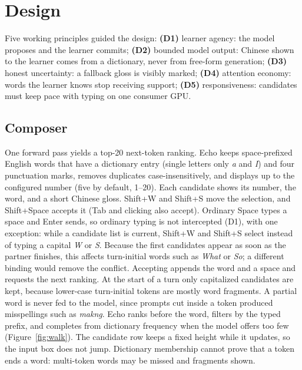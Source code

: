 \documentclass[11pt,a4paper]{article}
\begin{document}
\section{Design}
\label{sec:design}
Five working principles guided the design:
\textbf{(D1)} learner agency: the model proposes and the learner commits;
\textbf{(D2)} bounded model output: Chinese shown to the learner comes from a dictionary, never from free-form generation;
\textbf{(D3)} honest uncertainty: a fallback gloss is visibly marked;
\textbf{(D4)} attention economy: words the learner knows stop receiving support;
\textbf{(D5)} responsiveness: candidates must keep pace with typing on one consumer GPU.

\subsection{Composer}
One forward pass yields a top-20 next-token ranking. Echo keeps space-prefixed English words that have a dictionary entry (single letters only \emph{a} and \emph{I}) and four punctuation marks, removes duplicates case-insensitively, and displays up to the configured number (five by default, 1--20). Each candidate shows its number, the word, and a short Chinese gloss. Shift+W and Shift+S move the selection, and Shift+Space accepts it (Tab and clicking also accept). Ordinary Space types a space and Enter sends, so ordinary typing is not intercepted (D1), with one exception: while a candidate list is current, Shift+W and Shift+S select instead of typing a capital \emph{W} or \emph{S}. Because the first candidates appear as soon as the partner finishes, this affects turn-initial words such as \emph{What} or \emph{So}; a different binding would remove the conflict. Accepting appends the word and a space and requests the next ranking. At the start of a turn only capitalized candidates are kept, because lower-case turn-initial tokens are mostly word fragments. A partial word is never fed to the model, since prompts cut inside a token produced misspellings such as \emph{makng}. Echo ranks before the word, filters by the typed prefix, and completes from dictionary frequency when the model offers too few (Figure~\ref{fig:walk}). The candidate row keeps a fixed height while it updates, so the input box does not jump. Dictionary membership cannot prove that a token ends a word: multi-token words may be missed and fragments shown.
\end{document}
